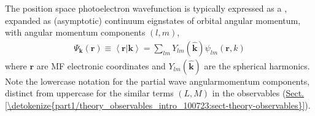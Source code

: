 \documentclass[letterpaper,table,10pt,english]{jupyterBook}
\begin{document}
\sphinxAtStartPar
The position space photoelectron wavefunction is typically expressed as a {\hyperref[\detokenize{backmatter/glossary:term-partial-wave-expansion}]{}}, expanded as (asymptotic) continuum
eignstates of orbital angular momentum, with angular momentum components
\((l,m)\),
\begin{equation}\label{equation:part1/theory_photoionization_dynamics_140723:eq:elwf}
\begin{split}\Psi_\mathbf{k}(\boldsymbol{r})\equiv\left<\boldsymbol{r}|\mathbf{k}\right> = \sum_{lm}Y_{lm}(\mathbf{\hat{k}})\psi_{lm}(\boldsymbol{r},k)
\end{split}
\end{equation}
\sphinxAtStartPar
where \(\boldsymbol{r}\) are MF electronic coordinates and
\(Y_{lm}(\mathbf{\hat{k}})\) are the spherical harmonics. Note the lower\sphinxhyphen{}case notation for the partial wave angular\sphinxhyphen{}momentum components, distinct from upper\sphinxhyphen{}case for the similar terms \((L,M)\) in the observables (\hyperref[\detokenize{part1/theory_observables_intro_100723:sect-theory-observables}]{Sect.\@ \ref{\detokenize{part1/theory_observables_intro_100723:sect-theory-observables}}}).
\end{document}
